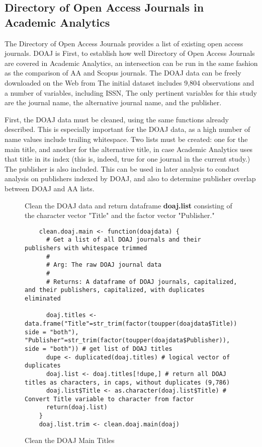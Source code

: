 \documentclass{article}
\begin{document}
\subsection{Directory of Open Access Journals in Academic Analytics}
The Directory of Open Access Journals provides a list of existing open access journals.
DOAJ is %
First, to establish how well Directory of Open Access Journals are covered in Academic Analytics, an intersection can be run in the same fashion as the comparison of AA and Scopus journals. 
The DOAJ data can be freely downloaded on the Web from %
The initial dataset includes 9,804 observations and a number of variables, including ISSN, %
The only pertinent variables for this study are the journal name, the alternative journal name, and the publisher.

First, the DOAJ data must be cleaned, using the same functions already described.
This is especially important for the DOAJ data, as a high number of name values include trailing whitespace. 
Two lists must be created: one for the main title, and another for the alternative title, in case Academic Analytics uses that title in its index (this is, indeed, true for one journal in the current study.)
The publisher is also included.
This can be used in later analysis to conduct analysis on publishers indexed by DOAJ, and also to determine publisher overlap between DOAJ and AA lists.
\begin{figure}[htpb]
	\centering
	\caption{Clean the DOAJ Main Titles}
	\footnotesize{
		Clean the DOAJ data and return dataframe \textbf{doaj.list} consisting of the character vector "Title" and the factor vector "Publisher."
			}
	\begin{lstlisting}
	clean.doaj.main <- function(doajdata) {
	  # Get a list of all DOAJ journals and their publishers with whitespace trimmed
	  #
	  # Arg: The raw DOAJ journal data
	  #
	  # Returns: A dataframe of DOAJ journals, capitalized, and their publishers, capitalized, with duplicates eliminated
	  
	  doaj.titles <- data.frame("Title"=str_trim(factor(toupper(doajdata$Title)), side = "both"), "Publisher"=str_trim(factor(toupper(doajdata$Publisher)), side = "both")) # get list of DOAJ titles
	  dupe <- duplicated(doaj.titles) # logical vector of duplicates
	  doaj.list <- doaj.titles[!dupe,] # return all DOAJ titles as characters, in caps, without duplicates (9,786)
	  doaj.list$Title <- as.character(doaj.list$Title) # Convert Title variable to character from factor
	  return(doaj.list)
	}
	doaj.list.trim <- clean.doaj.main(doaj)
	\end{lstlisting}
	
\end{figure}
\end{document}
